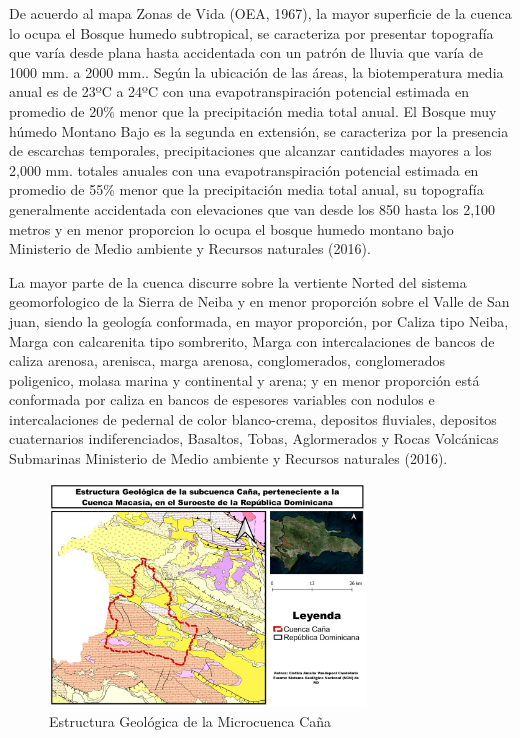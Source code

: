 \documentclass[11pt,]{article}
\begin{document}
De acuerdo al mapa Zonas de Vida (OEA, 1967), la mayor superficie de la
cuenca lo ocupa el Bosque humedo subtropical, se caracteriza por
presentar topografía que varía desde plana hasta accidentada con un
patrón de lluvia que varía de 1000 mm. a 2000 mm.. Según la ubicación de
las áreas, la biotemperatura media anual es de 23ºC a 24ºC con una
evapotranspiración potencial estimada en promedio de 20\% menor que la
precipitación media total anual. El Bosque muy húmedo Montano Bajo es la
segunda en extensión, se caracteriza por la presencia de escarchas
temporales, precipitaciones que alcanzar cantidades mayores a los 2,000
mm. totales anuales con una evapotranspiración potencial estimada en
promedio de 55\% menor que la precipitación media total anual, su
topografía generalmente accidentada con elevaciones que van desde los
850 hasta los 2,100 metros y en menor proporcion lo ocupa el bosque
humedo montano bajo Ministerio de Medio ambiente y Recursos naturales
(2016).

La mayor parte de la cuenca discurre sobre la vertiente Norted del
sistema geomorfologico de la Sierra de Neiba y en menor proporción sobre
el Valle de San juan, siendo la geología conformada, en mayor
proporción, por Caliza tipo Neiba, Marga con calcarenita tipo
sombrerito, Marga con intercalaciones de bancos de caliza arenosa,
arenisca, marga arenosa, conglomerados, conglomerados poligenico, molasa
marina y continental y arena; y en menor proporción está conformada por
caliza en bancos de espesores variables con nodulos e intercalaciones de
pedernal de color blanco-crema, depositos fluviales, depositos
cuaternarios indiferenciados, Basaltos, Tobas, Aglormerados y Rocas
Volcánicas Submarinas Ministerio de Medio ambiente y Recursos naturales
(2016).

\begin{figure}
\centering
\includegraphics[width=0.75000\textwidth]{mapa_geologico_cuenca_cana.jpg}
\caption{Estructura Geológica de la Microcuenca Caña}
\end{figure}
\end{document}
